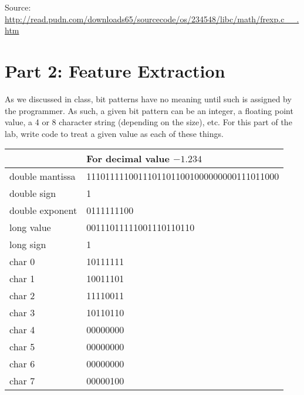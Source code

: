 \documentclass[letterpaper,12pt,titlepage]{article}
\begin{document}


Source: \hyperref[frexp.c]{http://read.pudn.com/downloads65/sourcecode/os/234548/libc/math/frexp.c\_\_.htm}

\newpage
\section*{Part 2: Feature Extraction}
As we discussed in class, bit patterns have no meaning until such is assigned by the programmer. As such, a given bit pattern can be an integer, a floating point value, a 4 or 8 character string (depending on the size), etc. For this part of the lab, write code to treat a given value as each of these things.

\begin{center}
\begin{tabular} {| l | l | }
\hline
\multicolumn{2}{|c|}{\textbf{For decimal value $-1.234$}} \\
\hline
double mantissa & 11101111100111011011001000000000111011000 \\
double sign & 1 \\
double exponent & 0111111100\\
long value & 00111011111001110110110\\
long sign & 1\\
char 0 & 10111111\\ 
char 1 & 10011101\\ 
char 2 & 11110011\\ 
char 3 & 10110110\\ 
char 4 & 00000000\\ 
char 5 & 00000000\\ 
char 6 & 00000000\\ 
char 7 & 00000100\\ \hline
\end{tabular}
\end{center}


\end{document}
